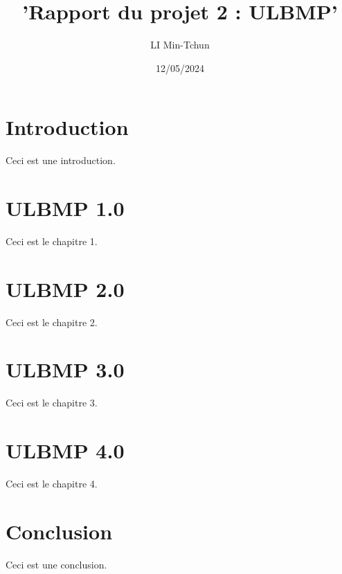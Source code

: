 \documentclass{report}
\title{'Rapport du projet 2 : ULBMP'}
\author{LI Min-Tchun}
\date{12/05/2024}
\begin{document}
	\maketitle
	\tableofcontents

\chapter{Introduction}
Ceci est une introduction.

\chapter{ULBMP 1.0}
Ceci est le chapitre 1.

\chapter{ULBMP 2.0}
Ceci est le chapitre 2.

\chapter{ULBMP 3.0}
Ceci est le chapitre 3.

\chapter{ULBMP 4.0}
Ceci est le chapitre 4.

\chapter{Conclusion}
Ceci est une conclusion.
\end{document}
